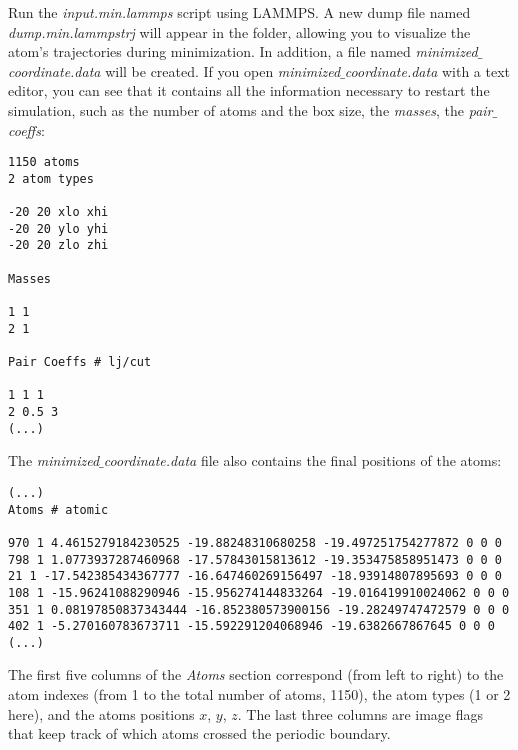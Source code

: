 Run the \textit{input.min.lammps} script using LAMMPS. A new dump file named \textit{dump.min.lammpstrj} will appear in the folder, allowing you to visualize
the atom's trajectories during minimization. In addition, a file named \textit{minimized$\_$coordinate.data} will be created. If you open \textit{minimized$\_$coordinate.data} with a text editor, you can see that it contains all the information necessary to restart the simulation, such as the number of atoms and the box size, the \textit{masses}, the \textit{pair$\_$coeffs}:
\begin{verbatim}
1150 atoms
2 atom types

-20 20 xlo xhi
-20 20 ylo yhi
-20 20 zlo zhi

Masses

1 1
2 1

Pair Coeffs # lj/cut

1 1 1
2 0.5 3
(...)
\end{verbatim}
The \textit{minimized$\_$coordinate.data} file also contains the final positions of the atoms:
\begin{verbatim}
(...)
Atoms # atomic

970 1 4.4615279184230525 -19.88248310680258 -19.497251754277872 0 0 0
798 1 1.0773937287460968 -17.57843015813612 -19.353475858951473 0 0 0
21 1 -17.542385434367777 -16.647460269156497 -18.93914807895693 0 0 0
108 1 -15.96241088290946 -15.956274144833264 -19.016419910024062 0 0 0
351 1 0.08197850837343444 -16.852380573900156 -19.28249747472579 0 0 0
402 1 -5.270160783673711 -15.592291204068946 -19.6382667867645 0 0 0
(...)
\end{verbatim}
The first five columns of the \textit{Atoms} section correspond (from left to right) to the atom indexes (from 1 to the total number of atoms, 1150), the atom types (1 or 2 here), and the atoms positions $x$, $y$, $z$. The last three columns are image flags that keep track of which atoms crossed the periodic boundary.

